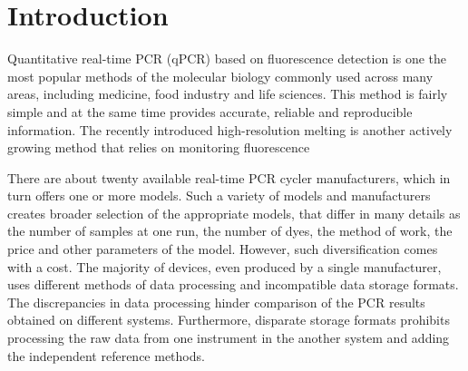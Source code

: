 \documentclass{bioinfo}
\begin{document}
\section{Introduction}

Quantitative real-time PCR (qPCR) based on fluorescence detection is one the 
most popular methods of the molecular biology commonly used across many areas, 
including medicine, food industry  and life sciences. This method is fairly simple and at 
the same time provides accurate, reliable and reproducible 
information\cite{kubista_real-time_2006}. The recently introduced high-resolution melting 
is another actively growing method that relies on monitoring fluorescence 
\cite{reed_high-resolution_2007}\cite{wittwer_high-resolution_2009}

There are about twenty available real-time PCR cycler manufacturers, which in 
turn offers one or more models. Such a variety of models and manufacturers creates
broader selection of the appropriate models, that differ in many details as the
number of samples at one run, the number of dyes, the method of work, the 
price and other parameters of the model. However, such diversification comes with a cost.
The majority of devices, even produced by a single manufacturer, uses different methods of data 
processing and incompatible data storage formats. The discrepancies in data processing hinder 
comparison of the PCR results obtained on different systems. Furthermore, 
disparate storage formats prohibits processing the raw data from one instrument 
in the another system and adding the independent reference methods.
\end{document}
